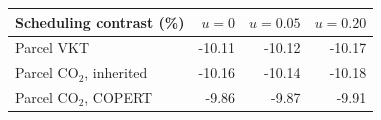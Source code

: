\begin{tabular}{@{}lrrr@{}}
\toprule Scheduling contrast (\%) & $u=0$ & $u=0.05$ & $u=0.20$ \\
\midrule
Parcel VKT & -10.11 & -10.12 & -10.17 \\
Parcel CO$_2$, inherited & -10.16 & -10.14 & -10.18 \\
Parcel CO$_2$, COPERT & -9.86 & -9.87 & -9.91 \\
\bottomrule
\end{tabular}
